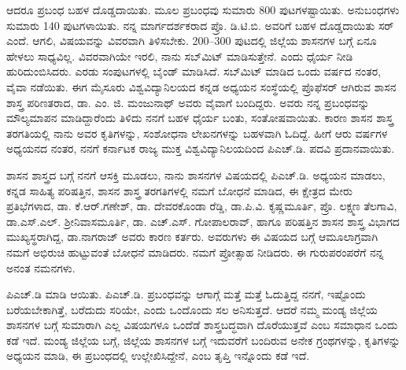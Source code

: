 ಆದರೂ ಪ್ರಬಂಧ ಬಹಳ ದೊಡ್ಡದಾಯಿತು. ಮೂಲ ಪ್ರಬಂಧವು ಸುಮಾರು 800 ಪುಟಗಳಷ್ಟಾಯಿತು. ಅನುಬಂಧಗಳು ಸುಮಾರು 140 ಪುಟಗಳಾಯಿತು. ನನ್ನ ಮಾರ್ಗದರ್ಶಕರಾದ ಪ್ರೊ. ಡಿ.ಟಿ.ಬಿ. ಅವರಿಗೆ ಬಹಳ ದೊಡ್ಡದಾಯಿತು ಸರ್​ ಎಂದೆ. ಆಗಲಿ, ವಿಷಯವನ್ನು ವಿವರವಾಗಿ ತಿಳಿಸಬೇಕು. 200–300 ಪುಟದಲ್ಲಿ ಜಿಲ್ಲೆಯ ಶಾಸನಗಳ ಬಗ್ಗೆ ಏನೂ ಹೇಳಲು ಸಾಧ್ಯವಿಲ್ಲ. ವಿವರವಾಗಿಯೇ ಇರಲಿ, ನಾನು ಸಬ್​ಮಿಟ್​ ಮಾಡಿಸುತ್ತೇನೆ. ಎಂದು ಧೈರ್ಯ ನೀಡಿ ಹುರಿದುಂಬಿಸಿದರು. ಎರಡು ಸಂಪುಟಗಳಲ್ಲಿ ಬೈಂಡ್​ ಮಾಡಿಸಿದೆ. ಸಬ್​ಮಿಟ್​ ಮಾಡಿದ ಒಂದು ವರ್ಷದ ನಂತರ, ವೈವಾ ನಡೆಯಿತು. ಈಗ ಮೈಸೂರು ವಿಶ್ವವಿದ್ಯಾನಿಲಯದ ಕನ್ನಡ ಅಧ್ಯಯನ ಸಂಸ್ಥೆಯಲ್ಲಿ ಪ್ರೊಫೆಸರ್​ ಆಗಿರುವ ಶಾಸನ ಶಾಸ್ತ್ರ ಪರಿಣತರಾದ, ಡಾ. ಎಂ. ಜಿ. ಮಂಜುನಾಥ್​ ಅವರು ವೈವಾಗೆ ಬಂದಿದ್ದರು. ಅವರು ನನ್ನ ಪ್ರಬಂಧವನ್ನು ಮೌಲ್ಯಮಾಪನ ಮಾಡಿದ್ದಾರೆಂದು ತಿಳಿದು ನನಗೆ ಬಹಳ ಧೈರ್ಯ ಬಂತು, ಸಂತೋಷವಾಯಿತು. ಕಾರಣ ಶಾಸನ ಶಾಸ್ತ್ರ ತರಗತಿಯಲ್ಲಿ ನಾನು ಅವರ ಕೃತಿಗಳನ್ನು, ಸಂಶೋಧನಾ ಲೇಖನಗಳನ್ನು ಬಹಳವಾಗಿ ಓದಿದ್ದೆ. ಹೀಗೆ ಆರು ವರ್ಷಗಳ ಅಧ್ಯಯನದ ನಂತರ, ನನಗೆ ಕರ್ನಾಟಕ ರಾಜ್ಯ ಮುಕ್ತ ವಿಶ್ವವಿದ್ಯಾನಿಲಯದಿಂದ ಪಿಎಚ್​.ಡಿ. ಪದವಿ ಪ್ರದಾನವಾಯಿತು. 

ಶಾಸನ ಶಾಸ್ತ್ರದ ಬಗ್ಗೆ ನನಗೆ ಆಸಕ್ತಿ ಮೂಡಲು, ನಾನು ಶಾಸನಗಳ ವಿಷಯದಲ್ಲಿ ಪಿಎಚ್​.ಡಿ. ಅಧ್ಯಯನ ಮಾಡಲು, ಕನ್ನಡ ಸಾಹಿತ್ಯ ಪರಿಷತ್ತಿನ, ಶಾಸನ ಶಾಸ್ತ್ರ ತರಗತಿಗಳಲ್ಲಿ ನಮಗೆ ಬೋಧನೆ ಮಾಡಿದ, ಈ ಕ್ಷೇತ್ರದ ಮೇರು ಪ್ರತಿಭೆಗಳಾದ, ಡಾ. ಕೆ.ಆರ್​.ಗಣೇಶ್​, ಡಾ. ದೇವರಕೊಂಡಾ ರೆಡ್ಡಿ, ಡಾ.ಪಿ.ವಿ. ಕೃಷ್ಣಮೂರ್ತಿ, ಪ್ರೊ. ಲಕ್ಷ್ಮಣ ತೆಲಗಾವಿ, ಡಾ.ಎಸ್​.ಎಲ್​. ಶ‍್ರೀನಿವಾಸಮೂರ್ತಿ, ಡಾ. ಎಚ್​.ಎಸ್​. ಗೋಪಾಲರಾವ್​, ಹಾಗೂ ಪರಿಷತ್ತಿನ ಶಾಸನ ಶಾಸ್ತ್ರ ವಿಭಾಗದ ಮುಖ್ಯಸ್ಥರಾಗಿದ್ದ, ಡಾ.ನಾಗರಾಜ್​ ಅವರು ಕಾರಣ ಕರ್ತರು. ಅವರುಗಳು ಈ ವಿಷಯದ ಬಗ್ಗೆ ಆಮೂಲಾಗ್ರವಾಗಿ ನಮಗೆ ಅಭಿರುಚಿ ಹುಟ್ಟುವಂತೆ ಬೋಧನೆ ಮಾಡಿದರು. ನಮಗೆ ಪ್ರೋತ್ಸಾಹ ನೀಡಿದರು. ಈ ಗುರುಪರಂಪರೆಗೆ ನನ್ನ ಅನಂತ ನಮನಗಳು. 

ಪಿಎಚ್​.ಡಿ ಮಾಡಿ ಆಯಿತು. ಪಿಎಚ್​.ಡಿ. ಪ್ರಬಂಧವನ್ನು ಆಗಾಗ್ಗೆ ಮತ್ತೆ ಮತ್ತೆ ಓದುತ್ತಿದ್ದ ನನಗೆ, ಇಷ್ಟೊಂದು ಬರೆಯಬೇಕಾಗಿತ್ತೆ, ಬರೆದುದು ಸರಿಯೇ, ಎಂದು ಒಂದೊಂದು ಸಲ ಅನಿಸುತ್ತದೆ. ಆದರೆ ನಮ್ಮ ಮಂಡ್ಯ ಜಿಲ್ಲೆಯ ಶಾಸನಗಳ ಬಗ್ಗೆ ಸುಮಾರಾಗಿ ಎಲ್ಲ ವಿಷಯಗಳೂ ಒಂದೆಡೆ ಶಾಸ್ತ್ರಬದ್ಧವಾಗಿ ದೊರೆಯುತ್ತವೆ ಎಂಬ ಸಮಾಧಾನ ಒಂದು ಕಡೆ ಇದೆ. ಮಂಡ್ಯ ಜಿಲ್ಲೆಯ ಬಗ್ಗೆ, ಜಿಲ್ಲೆಯ ಶಾಸನಗಳ ಬಗ್ಗೆ ಇದುವರೆಗೆ ಬಂದಿರುವ ಅನೇಕ ಗ್ರಂಥಗಳನ್ನು, ಕೃತಿಗಳನ್ನು ಅಧ್ಯಯನ ಮಾಡಿ, ಈ ಪ್ರಬಂಧದಲ್ಲಿ ಉಲ್ಲೇಖಿಸಿದ್ದೇನೆ, ಎಂಬ ತೃಪ್ತಿ ಇನ್ನೊಂದು ಕಡೆ ಇದೆ. 

